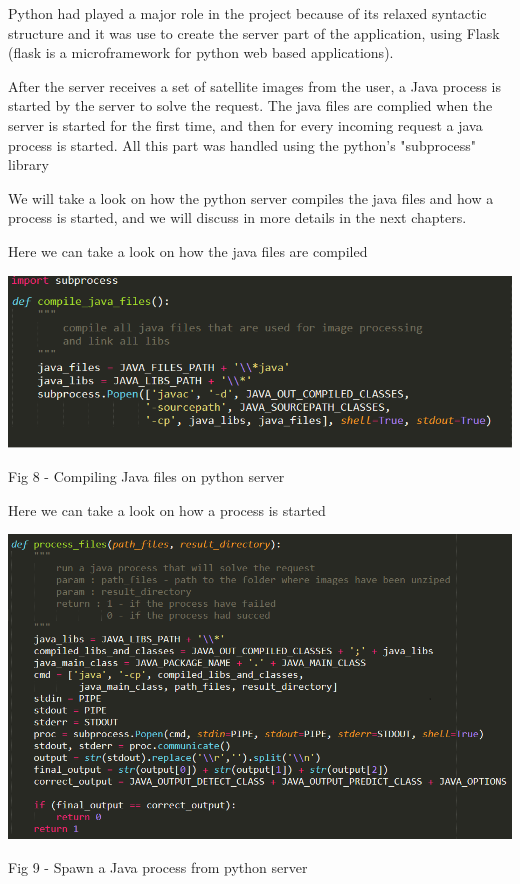 \documentclass[12pt, a4paper]{report}
\begin{document}
Python had played a major role in the project because of its relaxed syntactic structure and it was use to create the server part of the application, using Flask (flask is a microframework for python web based applications).
\par 

After the server receives a set of satellite images from the user, a Java process is started by the server to solve the request. The java files are complied when the server is started for the first time, and then for every incoming request a java process is started. All this part was handled using the python's "subprocess" library
\par
\medskip

We will take a look on how the python server compiles the java files and how a process is started, and we will discuss in more details in the next chapters.
\medskip

Here we can take a look on how the java files are compiled
\par
\bigskip
\includegraphics[scale=0.8, center]{python_call_java_1.png}
\begin{center}
Fig 8 - Compiling Java files on python server
\end{center}

\newpage

Here we can take a look on how a process is started
\par
\medskip
\includegraphics[scale=0.7, center]{python_call_java_2.png}
\begin{center}
Fig 9 - Spawn a Java process from python server
\end{center}
\end{document}
